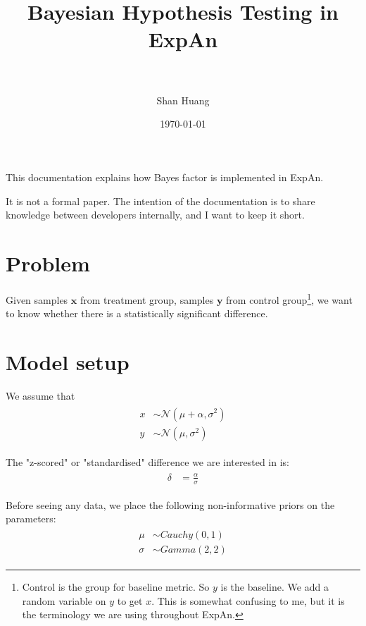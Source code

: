 \documentclass[paper=a4, fontsize=11pt]{scrartcl} %
\title{	
\normalfont \normalsize 
\textsc{} \\ [25pt] %
\horrule{0.5pt} \\[0.4cm] %
\huge Bayesian Hypothesis Testing in ExpAn  \\ %
\horrule{2pt} \\[0.5cm] %
}
\author{Shan Huang} %
\date{\normalsize\today} %
\numberwithin{equation}{section} %
\numberwithin{figure}{section} %
\numberwithin{table}{section} %
\begin{document}
\maketitle %


This documentation explains how Bayes factor is implemented in ExpAn. 

It is not a formal paper. The intention of the documentation is to share knowledge between developers internally, and I want to keep it short. 

\section{Problem}
Given samples $\textbf{x}$ from treatment group, samples $\textbf{y}$ from control group\footnote{Control is the group for baseline metric. So $y$ is the baseline. We add a random variable on $y$ to get $x$. This is somewhat confusing to me, but it is the terminology we are using throughout ExpAn. }, we want to know whether there is a statistically significant difference.


\section{ Model setup}

We assume that
\begin{align} 
\begin{split}
x &\sim \mathcal{N}(\mu + \alpha, \sigma^2)\\
y &\sim \mathcal{N}(\mu, \sigma^2)
\end{split}					
\end{align}

The "z-scored" or "standardised" difference we are interested in is:
\begin{align}
\begin{split}
\delta  &= \frac{\alpha}{ \sigma}
\end{split}					
\end{align}
 
Before seeing any data, we place the following non-informative priors on the parameters:
\begin{align}
\begin{split}
\mu &\sim \mathit{Cauchy} (0, 1) \\
\sigma &\sim \mathit{Gamma} (2, 2)
\end{split}
\end{align}
\end{document}
